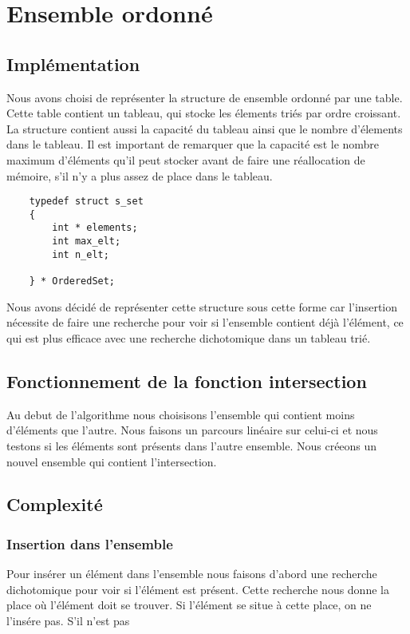 \documentclass{article}
\author{
    CHRISTOFFEL, Quentin
    \and
    NASSABAIN, Marco
}
\begin{document}
\section{Ensemble ordonné}

    \subsection{Implémentation}
    Nous avons choisi de représenter
    la structure de ensemble ordonné par une table.
    Cette table contient un tableau, qui stocke les
    élements triés par ordre croissant. La structure contient aussi
    la capacité du tableau ainsi que le nombre d'élements dans le tableau.
    Il est important de remarquer que la capacité est le
    nombre maximum d'éléments qu'il peut stocker
    avant de faire une réallocation de mémoire, s'il n'y a plus assez
    de place dans le tableau.

    \begin{verbatim}
    typedef struct s_set
    {
        int * elements;
        int max_elt;
        int n_elt;

    } * OrderedSet;
    \end{verbatim}

    Nous avons décidé de représenter cette structure sous cette forme
    car l'insertion nécessite de faire une recherche
    pour voir si l'ensemble contient déjà l'élément, ce qui est plus
    efficace avec une recherche dichotomique dans un tableau trié.

    \subsection{Fonctionnement de la fonction intersection}
    Au debut de l'algorithme nous choisisons l'ensemble qui contient moins
    d'éléments que l'autre. Nous faisons un parcours linéaire sur celui-ci
    et nous testons si les éléments sont présents dans l'autre ensemble.
    Nous créeons un nouvel ensemble qui contient l'intersection.

    \subsection{Complexité}

        \subsubsection{Insertion dans l'ensemble}
        Pour insérer un élément dans l'ensemble nous faisons d'abord une
        recherche dichotomique pour voir si l'élément est présent. Cette
        recherche nous donne la place où l'élément doit se trouver.
        Si l'élément se situe à cette place, on ne l'insére pas. S'il n'est pas
\end{document}
